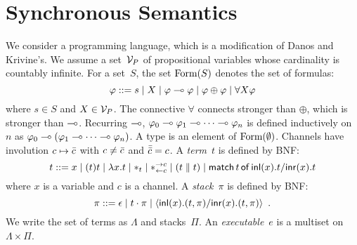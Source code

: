 


\section{Synchronous Semantics}


\newcommand{\conc}{\parallel}
\newcommand{\comod}[2]{\ast^{\rightarrow {#2}}_{\leftarrow{#1}}}
\newcommand{\reader}[1]{\ast_{\leftarrow{#1}}}

We consider a programming language, which is a modification of
Danos and Krivine's.
We assume a set~$\mathcal V_P$ of propositional variables whose cardinality is
countably infinite.
For a set~$S$,
the set $\mathop{\text{Form}}(S)$ denotes the set of formulas:
\[
\varphi::= s \mid X \mid \varphi\multimap\varphi\mid \varphi\oplus\varphi\mid
\forall X \varphi
\]
where $s\in S$ and $X\in \mathcal V_P$.
The connective $\forall$ connects stronger than $\oplus$, which is
stronger than $\multimap$.
Recurring $\multimap$,
$\varphi_0\multimap\varphi_1\multimap\cdots\multimap\varphi_n$ is defined inductively on~$n$
as
$\varphi_0\multimap(\varphi_1\multimap\cdots\multimap\varphi_n)$.
A type is an element of $\mathop{\text{Form}}(\emptyset)$.
Channels have involution $c\mapsto\bar{c}$ with
$c\neq \bar{c}$ and
$\bar{\bar{c}} = c$.
A \textit{term}~$t$ is defined by BNF:
\[
 t::= x
 \mid (t)t
 \mid \lambda x.t
 \mid \ast_t
 \mid \comod c c
 \mid (t\conc t)
 \mid \mat t x t x t
\]
where $x$ is a variable and $c$ is a channel.
A \textit{stack}~$\pi$ is defined by BNF:
\[
 \pi ::= \epsilon
 \mid t\cdot \pi
 \mid \langle \mathsf{inl}({x}). ({t},{\pi})/ \mathsf{inr}({x}). ({t},{\pi})\rangle
 \enspace.
\]
We write the set of terms as $\Lambda$ and stacks~$\Pi$.
An \textit{executable}~$e$ is a multiset on $\Lambda\times\Pi$.

